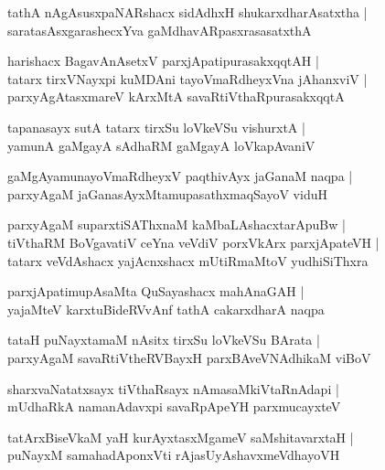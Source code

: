 \documentclass[twoside,12pt,openright]{book}
\newcounter{shloka}[chapter]
\begin{document}
\begin{shloka}
tathA nAgAsusxpaNARshacx sidAdhxH shukarxdharAsatxtha |\\
saratasAsxgarashecxYva gaMdhavARpasxrasasatxthA 
\end{shloka}

\begin{shloka}
harishacx BagavAnAsetxV parxjApatipurasakxqqtAH |\\
tatarx tirxVNayxpi kuMDAni tayoVmaRdheyxVna jAhanxviV |\\
parxyAgAtasxmareV kArxMtA savaRtiVthaRpurasakxqqtA
\end{shloka}

\begin{shloka}
tapanasayx sutA tatarx tirxSu loVkeVSu vishurxtA |\\
yamunA gaMgayA sAdhaRM gaMgayA loVkapAvaniV 
\end{shloka}

\begin{shloka}
gaMgAyamunayoVmaRdheyxV paqthivAyx jaGanaM naqpa |\\
parxyAgaM jaGanasAyxMtamupasathxmaqSayoV viduH 
\end{shloka}

\begin{shloka}
parxyAgaM suparxtiSAThxnaM kaMbaLAshacxtarApuBw |\\
tiVthaRM BoVgavatiV ceYna veVdiV porxVkArx parxjApateVH |\\
tatarx veVdAshacx yajAcnxshacx mUtiRmaMtoV yudhiSiThxra
\end{shloka}

\begin{shloka}
parxjApatimupAsaMta QuSayashacx mahAnaGAH |\\
yajaMteV karxtuBideRVvAnf tathA cakarxdharA naqpa 
\end{shloka}

\begin{shloka}
tataH puNayxtamaM nAsitx tirxSu loVkeVSu BArata |\\
parxyAgaM savaRtiVtheRVBayxH parxBAveVNAdhikaM viBoV
\end{shloka}

\begin{shloka}
sharxvaNatatxsayx tiVthaRsayx nAmasaMkiVtaRnAdapi |\\
mUdhaRkA namanAdavxpi savaRpApeYH parxmucayxteV 
\end{shloka}

\begin{shloka}
tatArxBiseVkaM yaH kurAyxtasxMgameV saMshitavarxtaH |\\
puNayxM samahadAponxVti rAjasUyAshavxmeVdhayoVH
\end{shloka}
\end{document}
